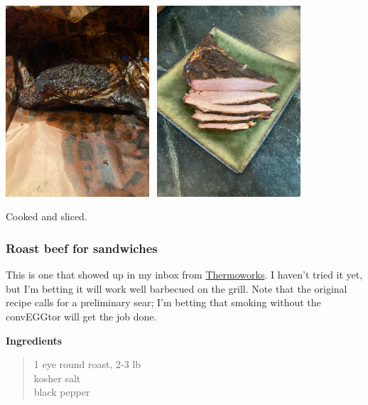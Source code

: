 \documentclass[
]{book}
\begin{document}
\includegraphics[width=0.4\textwidth,height=\textheight]{images/tritipafter1.jpeg}~ \includegraphics[width=0.4\textwidth,height=\textheight]{images/tritipafter2.jpeg}

Cooked and sliced.

\hypertarget{roast-beef-for-sandwiches}{%
\subsubsection{Roast beef for sandwiches}\label{roast-beef-for-sandwiches}}

This is one that showed up in my inbox from \href{https://blog.thermoworks.com/blog/homemade-deli-style-roast-beef/}{Thermoworks}. I haven't tried it yet, but I'm betting it will work well barbecued on the grill. Note that the original recipe calls for a preliminary sear; I'm betting that smoking without the convEGGtor will get the job done.

\textbf{Ingredients}

\begin{quote}
1 eye round roast, 2-3 lb\\
kosher salt\\
black pepper
\end{quote}
\end{document}
